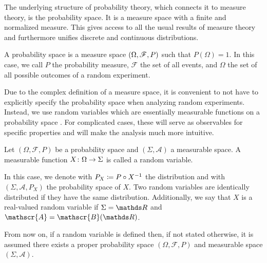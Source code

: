 \documentclass{stdlocal}
\begin{document}
      The underlying structure of probability theory, which connects it to measure theory, is the probability space.
      It is a measure space with a finite and normalized measure.
      This gives access to all the usual results of measure theory and furthermore unifies discrete and continuous distributions.
      \autocite[p.~193~ff.]{schmidt2009}

      \begin{definition}
        A probability space is a measure space $\left( \Omega, \mathscr{F}, P \right)$ such that $P(\Omega)=1$.
        In this case, we call $P$ the probability measure, $\mathscr{F}$ the set of all events, and $\Omega$ the set of all possible outcomes of a random experiment.
      \end{definition}
      Due to the complex definition of a measure space, it is convenient to not have to explicitly specify the probability space when analyzing random experiments.
      Instead, we use random variables which are essentially measurable functions on a probability space \autocite[p.~194]{schmidt2009}.
      For complicated cases, these will serve as observables for specific properties and will make the analysis much more intuitive.

      \begin{definition}
        Let $(\Omega,\mathscr{F},P)$ be a probability space and $(\Sigma,\mathscr{A})$ a measurable space.
        A measurable function $X\colon\Omega\to\Sigma$ is called a random variable.

        In this case, we denote with $P_X\coloneqq P\circ{X}^{-1}$ the distribution and with $(\Sigma,\mathscr{A},P_X)$ the probability space of $X$.
        Two random variables are identically distributed if they have the same distribution.
        Additionally, we say that $X$ is a real-valued random variable if $\Sigma = \setReal$ and $\mathscr{A} = \mathscr{B}(\setReal)$.
      \end{definition}
      From now on, if a random variable is defined then, if not stated otherwise, it is assumed there exists a proper probability space $(\Omega,\mathscr{F},P)$ and measurable space $(\Sigma, \mathscr{A})$.
\end{document}
